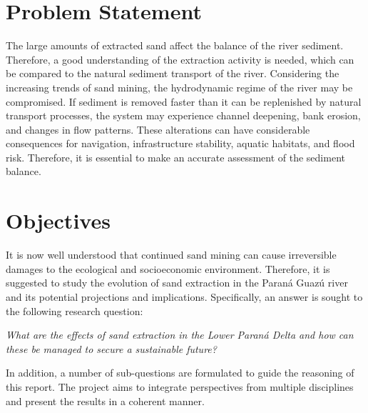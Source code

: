 \section{Problem Statement}
The large amounts of extracted sand affect the balance of the river sediment. Therefore, a good understanding of the extraction activity is needed, which can be compared to the natural sediment transport of the river. Considering the increasing trends of sand mining, the hydrodynamic regime of the river may be compromised. If sediment is removed faster than it can be replenished by natural transport processes, the system may experience channel deepening, bank erosion, and changes in flow patterns. These alterations can have considerable consequences for navigation, infrastructure stability, aquatic habitats, and flood risk. Therefore, it is essential to make an accurate assessment of the sediment balance.

\section{Objectives}


It is now well understood that continued sand mining can cause irreversible damages to the ecological and socioeconomic environment. Therefore, it is suggested to study the evolution of sand extraction in the Paraná Guazú river and its potential projections and implications. Specifically, an answer is sought to the following research question:

\textit{What are the effects of sand extraction in the Lower Paraná
Delta and how can these be managed to secure a sustainable future?}

In addition, a number of sub-questions are formulated to guide the reasoning of this report. The project aims to integrate perspectives from multiple disciplines and present the results in a coherent manner.

